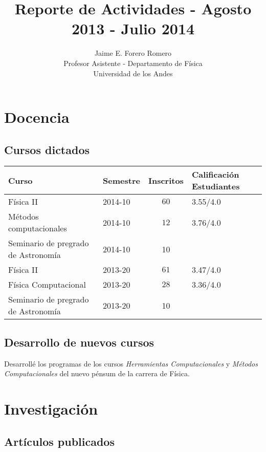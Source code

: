\documentclass{article}
\title{Reporte de Actividades - Agosto 2013 - Julio 2014}
\author{Jaime E. Forero Romero\\Profesor Asistente - Departamento de
  F\'isica\\Universidad de los Andes}
\begin{document}
\maketitle
\tableofcontents
\newpage

\section{Docencia}

\subsection{Cursos dictados}
\begin{tabular}{p{6.0cm} l c p{2cm}}\hline
Curso & Semestre & Inscritos & Calificaci\'on Estudiantes\\\hline
F\'isica II & 2014-10 & $60$  & 3.55/4.0\\
M\'etodos computacionales & 2014-10 & $12$ & 3.76/4.0\\
Seminario de pregrado de Astronom\'ia & 2014-10 & 10 & \\\hline
F\'isica II & 2013-20 & $61$ & 3.47/4.0\\
F\'isica Computacional & 2013-20 & $28$ & 3.36/4.0\\
Seminario de pregrado de Astronom\'ia & 2013-20 & 10 & \\\hline
\end{tabular}

\subsection{Desarrollo de nuevos cursos}
Desarroll\'e los programas de los cursos \emph{Herramientas
  Computacionales} y \emph{M\'etodos Computacionales} del nuevo
p\'ensum de la carrera de F\'isica.



\section{Investigaci\'on}

\subsection{Art\'iculos publicados}
\end{document}
